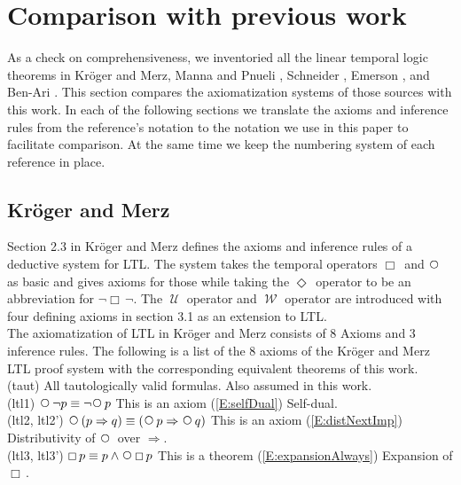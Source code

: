 \documentclass[12pt, fleqn, leqno]{article}
\newcommand{\impl}{\ensuremath{\Rightarrow}}        %
\newcommand{\Until}{\;\mathcal{U}\;}
\newcommand{\Wait}{\;\mathcal{W}\;}
\newcommand{\Next}{\;\,\text{\raisebox{3.5pt}{\circle{6}}}}
\newcommand{\Event}{\Diamond\,}
\newcommand{\Always}{\Box\,}
\begin{document}
\section{Comparison with previous work}\label{comparison-previous-work}

As a check on comprehensiveness, we inventoried all the linear temporal logic theorems in Kröger and Merz\cite{Kroger}, Manna and Pnueli \cite{Manna}, Schneider \cite{Schn}, Emerson \cite{Emer}, and Ben-Ari \cite{Ben}.
This section compares the axiomatization systems of those sources with this work. In each of the following sections we translate
the axioms and inference rules from the reference's notation to the notation we use in this paper to facilitate comparison.
At the same time we keep the numbering system of each reference in place.

\subsection{Kröger and Merz}

Section 2.3 in Kröger and Merz \cite{Kroger} defines the axioms and inference rules of a deductive system
for LTL. The system takes the temporal operators $\Always$ and $\Next$ as basic and gives axioms
for those while taking the $\Event$ operator to be an abbreviation for $\neg \Always \neg$. The $\Until$ operator
and  $\Wait$ operator are introduced with four defining axioms in section 3.1 as an extension to LTL.\\

The axiomatization of LTL in Kröger and Merz consists of 8 Axioms and 3 inference rules. The following is
a list of the 8 axioms of the Kröger and Merz LTL proof system with the corresponding equivalent theorems of this work.\\

(taut) All tautologically valid formulas. Also assumed in this work.\\

(ltl1) $\Next \neg p \equiv \neg \Next p$ This is an axiom (\ref{E:selfDual}) Self-dual.\\

(ltl2, ltl2') $\Next (p \impl q)  \equiv ( \Next p \impl \Next q)$ 
This is an axiom (\ref{E:distNextImp}) Distributivity of $\Next$ over $\impl$.\\

(ltl3, ltl3') $\Always p \equiv p \land \Next\Always p$ This is a theorem
 (\ref{E:expansionAlways}) Expansion of $\Always$.\\
  
\end{document}
